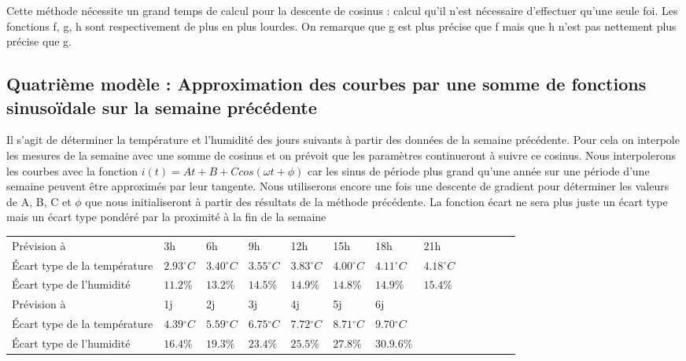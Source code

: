 \documentclass[11pt,a4paper]{article}
\begin{document}
Cette méthode nécessite un grand temps de calcul pour la descente de cosinus : calcul qu'il n'est nécessaire d'effectuer qu'une seule foi. Les fonctions f, g, h sont respectivement de plus en plus lourdes. On remarque que g est plus précise que f mais que h n'est pas nettement plus précise que g.



\subsection {Quatrième modèle : Approximation des courbes par une somme de fonctions sinusoïdale sur la semaine précédente }
Il s'agit de déterminer la température et l'humidité des jours suivants à partir des données de la semaine précédente. Pour cela on interpole les mesures de la semaine avec une somme de cosinus et on prévoit que les paramètres continueront à suivre ce cosinus. Nous interpolerons les courbes avec la fonction $i(t) = At + B + C cos  (\omega t + \phi)$  car les sinus de période plus grand qu'une année sur une période d'une semaine peuvent être approximés par leur tangente. Nous utiliserons encore une fois une descente de gradient pour déterminer les valeurs de A, B, C et $\phi$ que nous initialiseront à partir des résultats de la méthode précédente. La fonction écart ne sera plus juste un écart type mais un écart type pondéré par la proximité à la fin de la semaine \\

\begin{tabular}{lllllllllllll}\hline
\hline
Prévision à                  &3h                         &6h                        &9h                           &12h                         &15h                          &18h          &         21h      \\
Écart type de la température& $2.93{}^{\circ}C$& $3.40{}^{\circ}C$& $3.55{}^{\circ}C$& $3.83{}^{\circ}C$& $4.00{}^{\circ}C$& $4.11{}^{\circ}C$&$4.18{}^{\circ}C$\\
Écart type de l'humidité &$11.2\%$ & $13.2\%$ & $14.5\%$ & $14.9\%$ & $14.8\%$ & $14.9\%$ & $15.4\%$  \\
\hline
Prévision à                  & 1j &           2j            &3j            &4j          &5j            & 6j & \\
Écart type de la température&$4.39{}^{\circ}C$&$5.59{}^{\circ}C$&$6.75{}^{\circ}C$&$7.72{}^{\circ}C$&$8.71{}^{\circ}C$&$9.70{}^{\circ}C$ \\
Écart type de l'humidité      & $16.4\%$ &  $ 19.3\% $         &  $ 23.4\% $         &  $ 25.5\% $        &  $ 27.8\% $         &  $ 30.9.6\% $  \\
\hline 
\end{tabular}
	
\end{document}
